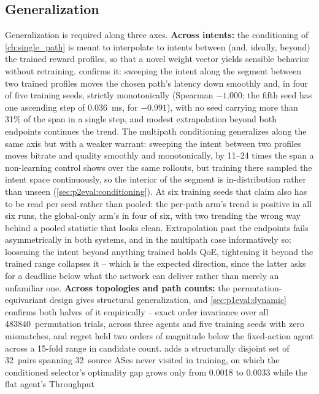 \subsection{Generalization}
\label{sec:analysis:generalization}

Generalization is required along three axes. \textbf{Across intents:} the conditioning of
\cref{ch:single_path} is meant to interpolate to intents between (and, ideally, beyond) the trained reward
profiles, so that a novel weight vector yields sensible behavior without retraining.
 confirms it: sweeping the intent along the segment between two trained
profiles moves the chosen path's latency down smoothly and, in four of five training seeds, strictly
monotonically (Spearman $-1.000$; the fifth seed has one ascending step of \SI{0.036}{\milli\second}, for
$-0.991$), with no seed carrying more than 31\% of the span in a single step, and modest extrapolation
beyond both endpoints continues the trend. The multipath conditioning generalizes along the same axis but with a weaker
warrant: sweeping the intent between two profiles moves bitrate and quality smoothly and monotonically,
by 11--24 times the span a non-learning control shows over the same rollouts, but training there sampled
the intent space continuously, so the interior of the segment is in-distribution rather than unseen
(\cref{sec:p2eval:conditioning}). At six training seeds that claim also has to be read per seed rather
than pooled: the per-path arm's trend is positive in all six runs, the global-only arm's in four of six,
with two trending the wrong way behind a pooled statistic that looks clean. Extrapolation past the endpoints fails asymmetrically in both systems,
and in the multipath case informatively so: loosening the intent beyond anything trained holds QoE,
tightening it beyond the trained range collapses it -- which is the expected direction, since the latter
asks for a deadline below what the network can deliver rather than merely an unfamiliar one.
\textbf{Across topologies and path counts:} the permutation-equivariant design gives
structural generalization, and \cref{sec:p1eval:dynamic} confirms both halves of it empirically -- exact
order invariance over all 483840~permutation trials, across three agents and five training seeds with
zero mismatches, and regret held two orders of magnitude below the fixed-action agent across a 15-fold
range in candidate count.  adds a
structurally disjoint set of 32~pairs spanning 32~source ASes never visited in training, on which the
conditioned selector's optimality gap grows only from 0.0018 to 0.0033 while the flat agent's Throughput
